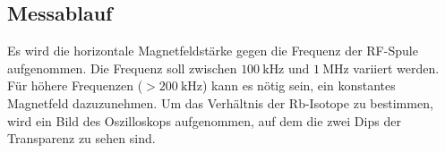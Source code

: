 \subsection{Messablauf}
Es wird die horizontale Magnetfeldstärke gegen die Frequenz der RF-Spule aufgenommen. Die Frequenz soll zwischen $\SI{100}{\kilo \hertz}$ und $\SI{1}{\mega \hertz}$ variiert werden. Für höhere Frequenzen ($>\SI{200}{\kilo \hertz}$) kann es nötig sein, ein konstantes Magnetfeld dazuzunehmen.
Um das Verhältnis der Rb-Isotope zu bestimmen, wird ein Bild des Oszilloskops aufgenommen, auf dem die zwei Dips der Transparenz zu sehen sind.
